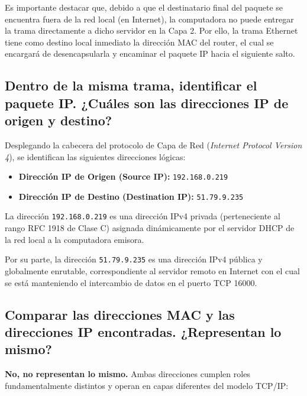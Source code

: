 \documentclass[12pt,a4paper]{article}
\begin{document}
Es importante destacar que, debido a que el destinatario final del paquete se encuentra fuera de la red local (en Internet), la computadora no puede entregar la trama directamente a dicho servidor en la Capa 2. Por ello, la trama Ethernet tiene como destino local inmediato la dirección MAC del router, el cual se encargará de desencapsularla y encaminar el paquete IP hacia el siguiente salto.

\subsection{Dentro de la misma trama, identificar el paquete IP. ¿Cuáles son las direcciones IP de origen y destino?}

Desplegando la cabecera del protocolo de Capa de Red (\textit{Internet Protocol Version 4}), se identifican las siguientes direcciones lógicas:

\begin{itemize}
    \item \textbf{Dirección IP de Origen (Source IP):} \texttt{192.168.0.219}
    \item \textbf{Dirección IP de Destino (Destination IP):} \texttt{51.79.9.235}
\end{itemize}

La dirección \texttt{192.168.0.219} es una dirección IPv4 privada (perteneciente al rango RFC 1918 de Clase C) asignada dinámicamente por el servidor DHCP de la red local a la computadora emisora. 

Por su parte, la dirección \texttt{51.79.9.235} es una dirección IPv4 pública y globalmente enrutable, correspondiente al servidor remoto en Internet con el cual se está manteniendo el intercambio de datos en el puerto TCP 16000.

\subsection{Comparar las direcciones MAC y las direcciones IP encontradas. ¿Representan lo mismo?}

\textbf{No, no representan lo mismo.} Ambas direcciones cumplen roles fundamentalmente distintos y operan en capas diferentes del modelo TCP/IP:
\end{document}
